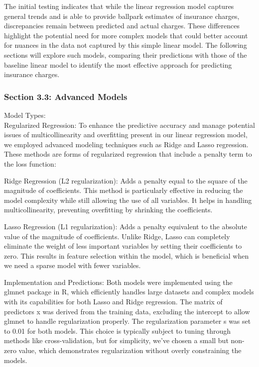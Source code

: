 \documentclass[
  12pt,
]{article}
\begin{document}
The initial testing indicates that while the linear regression model
captures general trends and is able to provide ballpark estimates of
insurance charges, discrepancies remain between predicted and actual
charges. These differences highlight the potential need for more complex
models that could better account for nuances in the data not captured by
this simple linear model. The following sections will explore such
models, comparing their predictions with those of the baseline linear
model to identify the most effective approach for predicting insurance
charges.

\subsubsection{Section 3.3: Advanced
Models}\label{section-3.3-advanced-models}

Model Types:\\
Regularized Regression: To enhance the predictive accuracy and manage
potential issues of multicollinearity and overfitting present in our
linear regression model, we employed advanced modeling techniques such
as Ridge and Lasso regression. These methods are forms of regularized
regression that include a penalty term to the loss function:

Ridge Regression (L2 regularization): Adds a penalty equal to the square
of the magnitude of coefficients. This method is particularly effective
in reducing the model complexity while still allowing the use of all
variables. It helps in handling multicollinearity, preventing
overfitting by shrinking the coefficients.

Lasso Regression (L1 regularization): Adds a penalty equivalent to the
absolute value of the magnitude of coefficients. Unlike Ridge, Lasso can
completely eliminate the weight of less important variables by setting
their coefficients to zero. This results in feature selection within the
model, which is beneficial when we need a sparse model with fewer
variables.

Implementation and Predictions: Both models were implemented using the
glmnet package in R, which efficiently handles large datasets and
complex models with its capabilities for both Lasso and Ridge
regression. The matrix of predictors x was derived from the training
data, excluding the intercept to allow glmnet to handle regularization
properly. The regularization parameter s was set to 0.01 for both
models. This choice is typically subject to tuning through methods like
cross-validation, but for simplicity, we've chosen a small but non-zero
value, which demonstrates regularization without overly constraining the
models.
\end{document}

